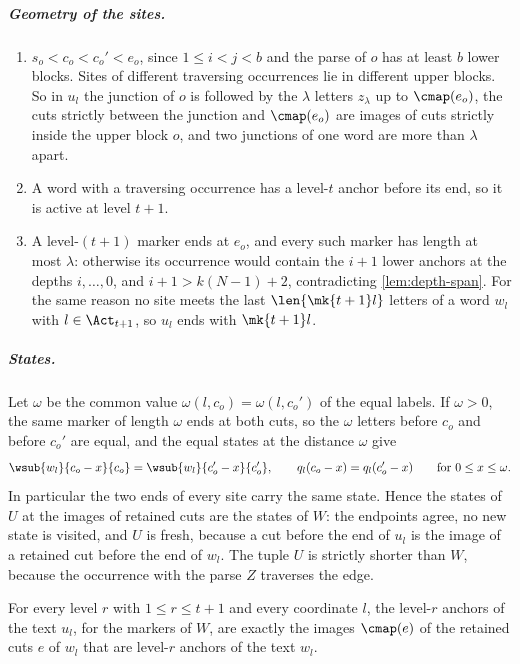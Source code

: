 \subparagraph*{Geometry of the sites.}
\begin{enumerate}[label=\textup{(G\arabic*)}]
\item\label{it:G1} $s_o<c_o<c_o'<e_o$, since $1\le i<j<b$ and the parse of
  $o$ has at least $b$ lower blocks. Sites of different traversing
  occurrences lie in different upper blocks. So in $u_l$ the junction of $o$
  is followed by the $\lambda$ letters $z_\lambda$ up to $\cmap(e_o)$, the
  cuts strictly between the junction and $\cmap(e_o)$ are images of cuts
  strictly inside the upper block $o$, and two junctions of one word are
  more than $\lambda$ apart.
\item\label{it:G2} A word with a traversing occurrence has a level-$t$
  anchor before its end, so it is active at level $t+1$.
\item\label{it:G3} A level-$(t+1)$ marker ends at $e_o$, and every such
  marker has length at most $\lambda$: otherwise its occurrence would
  contain the $i+1$ lower anchors at the depths $i,\dots,0$, and
  $i+1>k(N-1)+2$, contradicting \cref{lem:depth-span}. For the same reason
  no site meets the last $\len{\mk{t+1}l}$ letters of a word $w_l$ with
  $l\in\Act_{t+1}$, so $u_l$ ends with $\mk{t+1}l$.
\end{enumerate}

\subparagraph*{States.}
Let $\omega$ be the common value $\omega(l,c_o)=\omega(l,c_o')$ of the equal
labels. If $\omega>0$, the same marker of length $\omega$ ends at both cuts,
so the $\omega$ letters before $c_o$ and before $c_o'$ are equal, and the
equal states at the distance $\omega$ give
\begin{equation}\label{eq:window}
  \wsub{w_l}{c_o-x}{c_o}=\wsub{w_l}{c_o'-x}{c_o'},\qquad
  q_l(c_o-x)=q_l(c_o'-x)\qquad\text{for }0\le x\le\omega.
\end{equation}
In particular the two ends of every site carry the same state. Hence the
states of $U$ at the images of retained cuts are the states of $W$: the
endpoints agree, no new state is visited, and $U$ is fresh, because a cut
before the end of $u_l$ is the image of a retained cut before the end of
$w_l$. The tuple $U$ is strictly shorter than $W$, because the occurrence
with the parse $Z$ traverses the edge.

\begin{lemma}\label{lem:anchors-preserved}
For every level $r$ with $1\le r\le t+1$ and every coordinate $l$, the
level-$r$ anchors of the text $u_l$, for the markers of $W$, are exactly the
images $\cmap(e)$ of the retained cuts $e$ of $w_l$ that are level-$r$
anchors of the text $w_l$.
\end{lemma}

